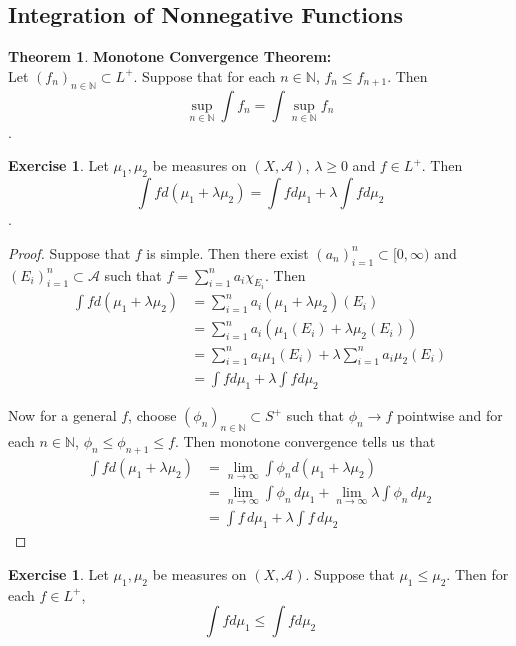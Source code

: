 \documentclass[12pt]{amsart}
\theoremstyle{definition}
\newtheorem{thm}[definition]{Theorem}
\newtheorem{ex}[definition]{Exercise}
\newcommand{\lam}{\lambda}
\newcommand{\N}{\mathbb{N}}
\newcommand{\MA}{\mathcal{A}}
\newcommand{\dmu}{\, d \mu}
\newcommand{\Rg}{[0,\infty)}
\newcommand{\limn}{\lim \limits_{n \rightarrow \infty}}
\newcommand{\lex}[1]{\label{ex:#1}}
\begin{document}
	\subsection{Integration of Nonnegative Functions}
	
	\begin{thm}\textbf{Monotone Convergence Theorem:} \\
		Let $(f_n)_{n \in \N} \subset L^+$. Suppose that for each $n \in \N$, $f_n \leq f_{n+1}$. Then $$\sup_{n \in \N} \int f_n = \int \sup_{n \in \N} f_n$$.
	\end{thm}
	
	\begin{ex} \lex{00000} 
		Let $\mu_1, \mu_2$ be measures on $(X, \MA)$, $\lam \geq 0$ and $f \in L^+$. Then $$\int f d (\mu_1 + \lam \mu_2) = \int f d\mu_1 + \lam \int f d\mu_2$$.  
	\end{ex}
	
	\begin{proof}
		Suppose that $f$ is simple. Then there exist $(a_n)_{i=1}^n \subset \Rg$ and $(E_i)_{i=1}^n \subset \MA$ such that $f = \sum\limits_{i =1}^n a_i \chi_{E_i}$. Then 
		\begin{align*}
			\int f d(\mu_1 + \lam \mu_2) 
			&= \sum\limits_{i =1}^n a_i (\mu_1 + \lam \mu_2)(E_i)\\
			&= \sum\limits_{i =1}^n a_i (\mu_1(E_i) + \lam \mu_2(E_i))\\
			&= \sum\limits_{i =1}^n a_i \mu_1(E_i) + \lam \sum\limits_{i =1}^n a_i   \mu_2(E_i)\\
			&= \int f d\mu_1 + \lam \int f d\mu_2
		\end{align*}
		
		Now for a general $f$, choose $(\phi_n)_{n \in \N} \subset S^+$ such that $\phi_n \rightarrow f$ pointwise and for each $n \in \N$, $\phi_n \leq \phi_{n+1} \leq f$. Then monotone convergence tells us that 
		\begin{align*}
			\int f d(\mu_1 + \lam \mu_2) 
			&= \limn \int \phi_n d(\mu_1 + \lam \mu_2)\\
			&= \limn \int \phi_n \dmu_1 + \limn \lam \int \phi_n \dmu_2 \\
			&= \int f \dmu_1 +  \lam \int f \dmu_2
		\end{align*}
		
	\end{proof}
	
	
	\begin{ex} \lex{00000} 
		Let $\mu_1, \mu_2$ be measures on $(X,\MA)$. Suppose that $\mu_1 \leq \mu_2$. Then for each $f \in L^+$, $$\int f d\mu_1 \leq \int f d\mu_2$$
	\end{ex}
	
\end{document}
